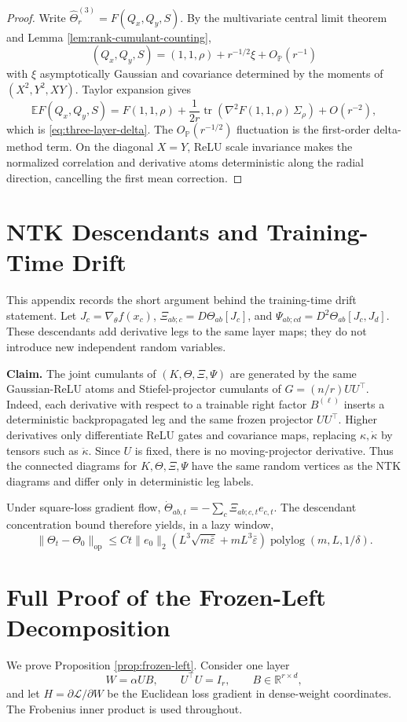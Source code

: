 \documentclass{article}
\newcommand{\E}{\mathbb E}
\newcommand{\Pp}{\mathbb P}
\newcommand{\R}{\mathbb R}
\newcommand{\tr}{\operatorname{tr}}
\newcommand{\op}{\mathrm{op}}
\newcommand{\wh}{\widehat}
\newcommand{\barE}{\bar\varepsilon}
\begin{document}
\begin{proof}
Write \(\wh\Theta^{(3)}_r=F(Q_x,Q_y,S)\). By the multivariate central limit theorem and Lemma \ref{lem:rank-cumulant-counting},
\[
(Q_x,Q_y,S)=(1,1,\rho)+r^{-1/2}\xi+O_{\Pp}(r^{-1})
\]
with \(\xi\) asymptotically Gaussian and covariance determined by the moments of \((X^2,Y^2,XY)\). Taylor expansion gives
\[
\E F(Q_x,Q_y,S)
=F(1,1,\rho)+\frac1{2r}\tr\left(\nabla^2F(1,1,\rho)\,\Sigma_\rho\right)+O(r^{-2}),
\]
which is \eqref{eq:three-layer-delta}. The \(O_{\Pp}(r^{-1/2})\) fluctuation is the first-order delta-method term. On the diagonal \(X=Y\), ReLU scale invariance makes the normalized correlation and derivative atoms deterministic along the radial direction, cancelling the first mean correction.
\end{proof}

\section{NTK Descendants and Training-Time Drift}
\label{app:ntk-descendants}
This appendix records the short argument behind the training-time drift statement. Let \(J_c=\nabla_\theta f(x_c)\), \(\Xi_{ab;c}=D\Theta_{ab}[J_c]\), and \(\Psi_{ab;cd}=D^2\Theta_{ab}[J_c,J_d]\). These descendants add derivative legs to the same layer maps; they do not introduce new independent random variables.

\noindent\textbf{Claim.}
The joint cumulants of \((K,\Theta,\Xi,\Psi)\) are generated by the same Gaussian-ReLU atoms and Stiefel-projector cumulants of \(G=(n/r)UU^\top\). Indeed, each derivative with respect to a trainable right factor \(B^{(\ell)}\) inserts a deterministic backpropagated leg and the same frozen projector \(UU^\top\). Higher derivatives only differentiate ReLU gates and covariance maps, replacing \(\kappa,\dot\kappa\) by tensors such as \(\ddot\kappa\). Since \(U\) is fixed, there is no moving-projector derivative. Thus the connected diagrams for \(K,\Theta,\Xi,\Psi\) have the same random vertices as the NTK diagrams and differ only in deterministic leg labels.

Under square-loss gradient flow, \(\dot\Theta_{ab,t}=-\sum_c\Xi_{ab;c,t}e_{c,t}\). The descendant concentration bound therefore yields, in a lazy window,
\[
\|\Theta_t-\Theta_0\|_{\op}
\le
C t\|e_0\|_2\left(L^3\sqrt{m\barE}+mL^3\barE\right)\operatorname{polylog}(m,L,1/\delta).
\]

\section{Full Proof of the Frozen-Left Decomposition}
\label{app:frozen-left-full-proof}
We prove Proposition \ref{prop:frozen-left}. Consider one layer
\[
W=\alpha UB,\qquad U^\top U=I_r,\qquad B\in\R^{r\times d},
\]
and let \(H=\partial \mathcal L/\partial W\) be the Euclidean loss gradient in dense-weight coordinates. The Frobenius inner product is used throughout.
\end{document}
